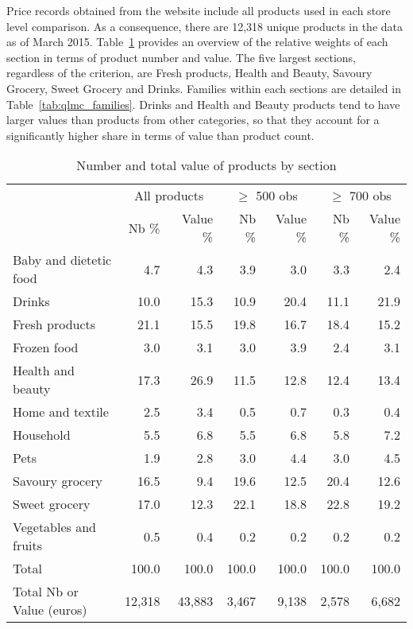 \documentclass[english]{article}
\begin{document}
Price records obtained from the website include all products used in each store level comparison. As a consequence, there are 12,318 unique products in the data as of March 2015. Table~\ref{tab:qlmc_sections} provides an overview of the relative weights of each section in terms of product number and value. The five largest sections, regardless of the criterion, are Fresh products, Health and Beauty, Savoury Grocery, Sweet Grocery and Drinks. Families within each sections are detailed in Table~\ref{tab:qlmc_families}. Drinks and Health and Beauty products tend to have larger values than products from other categories, so that they account for a significantly higher share in terms of value than product count.

\begin{table}[H]
\renewcommand{\arraystretch}{0.7}%
\caption{Number and total value of products by section}\label{tab:qlmc_sections}
\small
\begin{tabular}{lrr|rr|rr}
\toprule
\toprule
& \multicolumn{2}{c|}{All products} & \multicolumn{2}{c|}{$\ge$ 500 obs} & \multicolumn{2}{c}{$\ge$ 700 obs} \\
& Nb \% & Value \% & Nb \% & Value \% & Nb \% & Value \% \\
\midrule
    Baby and dietetic food & 4.7   & 4.3   & 3.9   & 3.0   & 3.3   & 2.4 \\
    Drinks & 10.0  & 15.3  & 10.9  & 20.4  & 11.1  & 21.9 \\
    Fresh products & 21.1  & 15.5  & 19.8  & 16.7  & 18.4  & 15.2 \\
    Frozen food & 3.0   & 3.1   & 3.0   & 3.9   & 2.4   & 3.1 \\
    Health and beauty & 17.3  & 26.9  & 11.5  & 12.8  & 12.4  & 13.4 \\
    Home and textile & 2.5   & 3.4   & 0.5   & 0.7   & 0.3   & 0.4 \\
    Household & 5.5   & 6.8   & 5.5   & 6.8   & 5.8   & 7.2 \\
    Pets  & 1.9   & 2.8   & 3.0   & 4.4   & 3.0   & 4.5 \\
    Savoury grocery & 16.5  & 9.4   & 19.6  & 12.5  & 20.4  & 12.6 \\
    Sweet grocery & 17.0  & 12.3  & 22.1  & 18.8  & 22.8  & 19.2 \\
    Vegetables and fruits & 0.5   & 0.4   & 0.2   & 0.2   & 0.2   & 0.2 \\
\midrule
    Total & 100.0 & 100.0 & 100.0 & 100.0 & 100.0 & 100.0 \\
    Total Nb or Value (euros) & 12,318 & 43,883 & 3,467 & 9,138 & 2,578 & 6,682 \\
\bottomrule
\bottomrule
\end{tabular}
\end{table}
\end{document}
